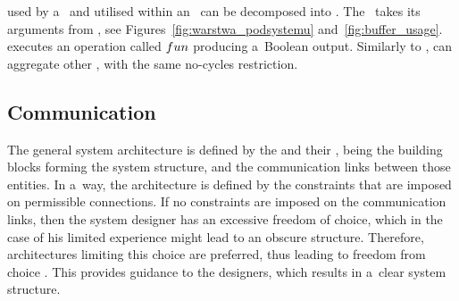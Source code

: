 \documentclass[11pt,oneside,a4paper]{article}
\newcommand{\Figure}[0]{Figure}
\newcommand{\Figures}[0]{Figures}
\begin{document}
	
	
	
	


	
	\TerminalConditions{} used by a~\BasicBehaviour{} and \InitialConditions{} utilised within an~\FsmTransition{}
	can be decomposed into \Predicates{}. The~\Predicate{} takes its arguments from \Subsystem{}
	\Buffers{}, see \Figures{}~\ref{fig:warstwa_podsystemu} and~\ref{fig:buffer_usage}. \Predicate{} executes an operation
	called $fun{}$ producing a~Boolean output. Similarly to \PrimitiveTransitionFunctions{}, \Predicate{} can aggregate other \Predicates{}, with the same no-cycles restriction.
	
	\subsection{\EmbodiedAgent{} Communication}
	\label{sec:communication}
	
	The general system architecture is defined by the \Agents{} and their \Subsystems{}, being the building blocks forming the system structure, and the communication links between those entities.
	In a~way, the architecture is defined by the constraints that are imposed on permissible connections. If no constraints are imposed on the communication links, then the system designer
	has an excessive freedom of choice, which in the case of his limited experience might lead to an obscure structure.
	Therefore, architectures limiting this choice are preferred, thus leading to freedom from choice \cite{dennis2016smartmdsd}. This provides guidance to
	the designers, which results in a~clear system structure.
	
\end{document}

